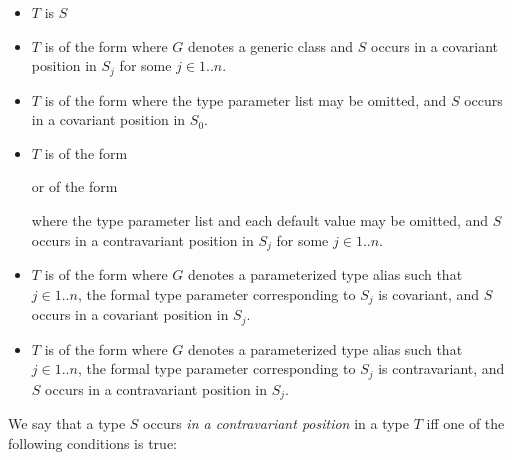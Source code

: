 \documentclass{article}
\begin{document}
\begin{itemize}
\item $T$ is $S$

\item $T$ is of the form 
  where $G$ denotes a generic class
  and $S$ occurs in a covariant position in $S_j$ for some $j \in 1 .. n$.

\item $T$ is of the form
  where the type parameter list may be omitted,
  and $S$ occurs in a covariant position in $S_0$.

\item $T$ is of the form



  \noindent
  or of the form



  \noindent
  where the type parameter list and each default value may be omitted,
  and $S$ occurs in a contravariant position in $S_j$
  for some $j \in 1 .. n$.

\item $T$ is of the form 
  where $G$ denotes a parameterized type alias such that
  $j \in 1 .. n$,
  the formal type parameter corresponding to $S_j$ is covariant,
  and $S$ occurs in a covariant position in $S_j$.

\item $T$ is of the form 
  where $G$ denotes a parameterized type alias such that
  $j \in 1 .. n$,
  the formal type parameter corresponding to $S_j$ is contravariant,
  and $S$ occurs in a contravariant position in $S_j$.
\end{itemize}

\LMHash{}
We say that a type $S$ occurs {\em in a contravariant position} in a type $T$
if{}f one of the following conditions is true:
\end{document}
